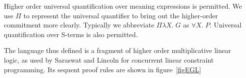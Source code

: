 Higher order universal quantification over meaning expressions is permitted.
We use $\Pi$ to represent the universal quantifier to bring out the
higher-order commitment more clearly.  Typically we abbreviate
$\Pi\lambda X.\; G$ as $\forall X.\; P$.  Universal quantification over
S-terms is also permitted.

The language thus defined is a fragment of higher order multiplicative
linear logic, as used by Saraswat and Lincoln for concurrent linear
constraint programming.  Its sequent proof rules are shown
in figure~\ref{figEGL}
\begin{figure}
\end{figure}
